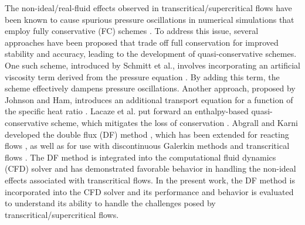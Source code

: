 The non-ideal/real-fluid effects observed in transcritical/supercritical flows have been known to cause spurious pressure oscillations in numerical simulations that employ fully conservative (FC) schemes \cite{schmitt2010large,terashima2012approach,ruiz2012unsteady,hickey2013large,kawai2015robust}. To address this issue, several approaches have been proposed that trade off full conservation for improved stability and accuracy, leading to the development of quasi-conservative schemes. One such scheme, introduced by Schmitt et al., involves incorporating an artificial viscosity term derived from the pressure equation \cite{schmitt2010large}. By adding this term, the scheme effectively dampens pressure oscillations. Another approach, proposed by Johnson and Ham, introduces an additional transport equation for a function of the specific heat ratio \cite{johnsen2012preventing}. Lacaze et al. put forward an enthalpy-based quasi-conservative scheme, which mitigates the loss of conservation \cite{lacaze2019comparison}. Abgrall and Karni developed the double flux (DF) method \cite{abgrall2001computations}, which has been extended for reacting flows \cite{billet2003adaptive}, as well as for use with discontinuous Galerkin methods \cite{billet2011runge,lv2014discontinuous} and transcritical flows \cite{ma2017entropy,tudisco2020numerical}. The DF method \cite{ma2017entropy} is integrated into the computational fluid dynamics (CFD) solver and has demonstrated favorable behavior in handling the non-ideal effects associated with transcritical flows. In the present work, the DF method is incorporated into the CFD solver and its performance and behavior is evaluated to understand its ability to handle the challenges posed by transcritical/supercritical flows.


